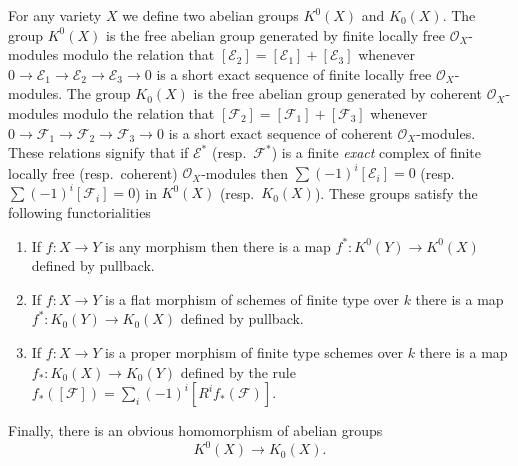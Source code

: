 \medskip\noindent
For any variety $X$ we define two abelian groups $K^0(X)$ and
$K_0(X)$. The group $K^0(X)$ is the free abelian group generated
by finite locally free ${\mathcal O}_X$-modules modulo the
relation that $[{\mathcal E}_2] = [{\mathcal E}_1] + [{\mathcal E}_3]$
whenever 
$
0
\to
{\mathcal E}_1
\to 
{\mathcal E}_2
\to 
{\mathcal E}_3
\to 
0
$
is a short exact sequence of finite locally free ${\mathcal O}_X$-modules.
The group $K_0(X)$ is the free abelian group generated
by coherent ${\mathcal O}_X$-modules modulo the
relation that $[{\mathcal F}_2] = [{\mathcal F}_1] + [{\mathcal F}_3]$
whenever 
$
0
\to
{\mathcal F}_1
\to 
{\mathcal F}_2
\to 
{\mathcal F}_3
\to 
0
$
is a short exact sequence of coherent ${\mathcal O}_X$-modules.
These relations signify that if ${\mathcal E}^*$ (resp.\ ${\mathcal F}^*$)
is a finite {\it exact} complex of finite locally free (resp.\ coherent)
${\mathcal O}_X$-modules then $\sum (-1)^i[{\mathcal E}_i] = 0$ (resp.\ 
$\sum (-1)^i[{\mathcal F}_i] = 0$) in $K^0(X)$ (resp.\ $K_0(X)$).
These groups satisfy the following functorialities
\begin{enumerate}
\item{} If $ f : X \to Y$ is any morphism then there is a
map $f^* : K^0(Y) \to K^0(X)$ defined by pullback.
\item{} If $f : X \to Y$ is a flat morphism of schemes of finite type
over $k$ there is a map $f^* : K_0(Y) \to K_0(X)$ defined by pullback.
\item{} If $f : X \to Y$ is a proper morphism of finite type
schemes over $k$ there is a map $f_* : K_0(X) \to K_0(Y)$
defined by the rule
$f_*([{\mathcal F}]) = \sum_i (-1)^i [R^if_*({\mathcal F})]$.
\end{enumerate}
Finally, there is an obvious homomorphism of abelian groups
$$
K^0(X) \longrightarrow K_0(X).
$$

